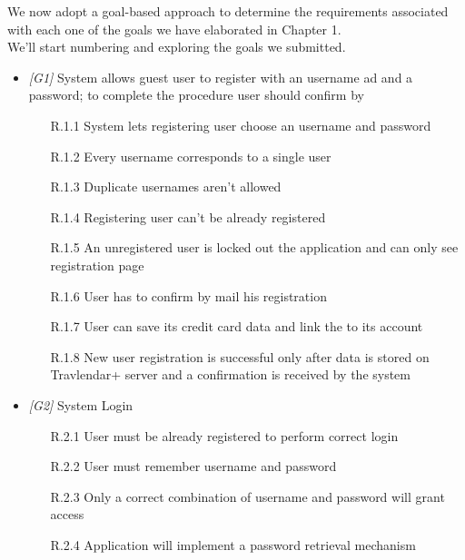 We now adopt a goal-based approach to determine the requirements associated with each one of the goals we have elaborated in Chapter 1.\\
We'll start numbering and exploring the goals we submitted.

\begin{itemize}

            \item \textit{[G1]} System allows guest user to register with an username ad and a password; to complete the procedure user should confirm by 
               
                  \begin{itemize}
                        \item [R.1.1] System lets registering user choose an username and password
                        \item [R.1.2] Every username corresponds to a single user
                        \item [R.1.3] Duplicate usernames aren’t allowed
                        \item [R.1.4] Registering user can't be already registered
                        \item [R.1.5] An unregistered user is locked out the application and can only see registration page
                        \item [R.1.6] User has to confirm by mail his registration
                        \item [R.1.7] User can save its credit card data and link the to its account
                        \item [R.1.8] New user registration is successful only after data is stored on Travlendar+ server and a confirmation is received by the system
                  \end{itemize}
             
\item \textit{[G2]} System Login

                  \begin{itemize}
                        \item [R.2.1] User must be already registered to perform correct login
                        \item [R.2.2] User must remember username and password
                        \item [R.2.3] Only a correct combination of username and password will grant access
                        \item [R.2.4] Application will implement a password retrieval mechanism
                  \end{itemize}
                  

\end{itemize}
